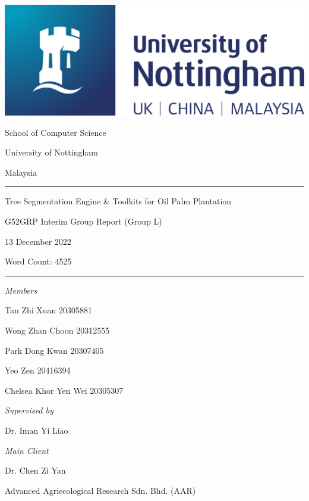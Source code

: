 \documentclass[a4paper, 12pt]{article}
\begin{document}
\begin{titlepage}

\begin{center}


\includegraphics[scale=0.6]{Images/UONLogo.png}

\vspace*{12pt}

School of Computer Science

University of Nottingham

Malaysia

\rule{\linewidth}{0.4pt}

\vspace{12pt}

{\Large Tree Segmentation Engine \& Toolkits for Oil Palm Plantation}

\vspace{12pt}

G52GRP Interim Group Report (Group L)

13 December 2022

Word Count: 4525

\rule{\linewidth}{0.4pt}

\vspace{12pt}

\textit{Members}

Tan Zhi Xuan 20305881

Wong Zhan Choon 20312555

Park Dong Kwan 20307405

Yeo Zen 20416394

Chelsea Khor Yen Wei 20305307

\vspace{12pt}

\textit{Supervised by}

Dr. Iman Yi Liao

\vspace{12pt}

\textit{Main Client}

Dr. Chen Zi Yan

Advanced Agriecological Research Sdn. Bhd. (AAR)

\end{center}

    
\end{titlepage}
\end{document}
